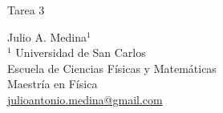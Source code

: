 \documentclass[a4paper]{article}
\begin{document}

\Large
 \begin{center}
Tarea 3\\


\hspace{10pt}

\large
Julio A. Medina$^1$ \\
\hspace{10pt}
\small  
$^1$ Universidad de San Carlos\\
Escuela de Ciencias Físicas y Matemáticas\\
Maestría en Física\\
\href{mailto:julioantonio.medina@gmail.com}{julioantonio.medina@gmail.com}\\

\end{center}

\hspace{10pt}

\normalsize
\end{document}
